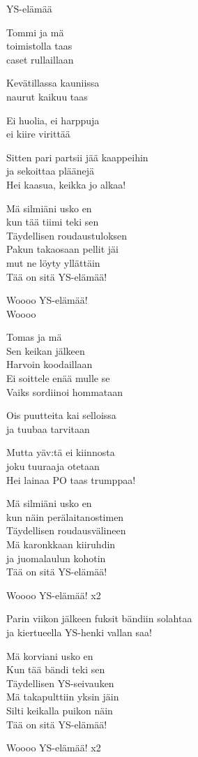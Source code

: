 \begin{song}{YS-elämää}
    

    Tommi ja mä\\
    toimistolla taas\\
    caset rullaillaan

    Kevätillassa kauniissa\\
    naurut kaikuu taas

    Ei huolia, ei harppuja\\
    ei kiire virittää

    Sitten pari partsii jää kaappeihin\\
    ja sekoittaa pläänejä\\
    Hei kaasua, keikka jo alkaa!

    Mä silmiäni usko en\\
    kun tää tiimi teki sen\\
    Täydellisen roudaustuloksen\\
    Pakun takaosaan pellit jäi\\
    mut ne löyty yllättäin\\
    Tää on sitä YS-elämää!

    Woooo YS-elämää!\\
    Woooo

    Tomas ja mä\\
    Sen keikan jälkeen\\
    Harvoin koodaillaan\\
    Ei soittele enää mulle se\\
    Vaiks sordiinoi hommataan

    Ois puutteita kai selloissa\\
    ja tuubaa tarvitaan

    Mutta yäv:tä ei kiinnosta\\
    joku tuuraaja otetaan\\
    Hei lainaa PO taas trumppaa!

    Mä silmiäni usko en\\
    kun näin perälaitanostimen\\
    Täydellisen roudausvälineen\\
    Mä karonkkaan kiiruhdin\\
    ja juomalaulun kohotin\\
    Tää on sitä YS-elämää!

    Woooo YS-elämää! x2

    Parin viikon jälkeen fuksit bändiin solahtaa\\
    ja kiertueella YS-henki vallan saa!

    Mä korviani usko en\\
    Kun tää bändi teki sen\\
    Täydellisen YS-seivauken\\
    Mä takapulttiin yksin jäin\\
    Silti keikalla puikon näin\\
    Tää on sitä YS-elämää!

    Woooo YS-elämää! x2

\end{song}